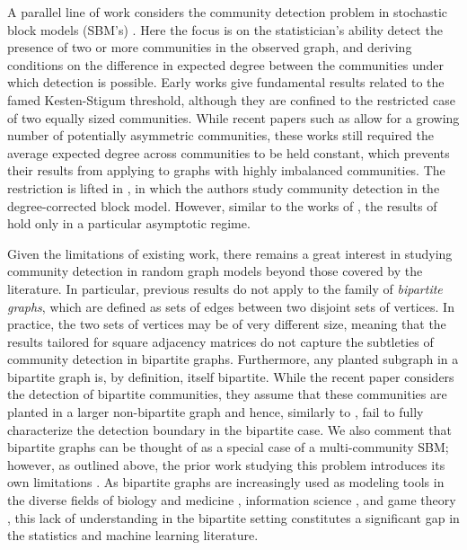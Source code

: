 \documentclass{article}
\begin{document}
A parallel line of work considers the community detection problem in stochastic block models (SBM's) \cite{janson2010asymptotic, massoulie2014community, mossel2015reconstruction, abbe2015community, banerjee2018contiguity, banerjee2017optimal, banks2016information, gao2017testing}. Here the focus is on the statistician's ability detect the presence of two or more communities in the observed graph, and deriving conditions on the difference in expected degree between the communities under which detection is possible. Early works \cite{abbe2015community, mossel2015reconstruction} give fundamental results related to the famed Kesten-Stigum threshold, although they are confined to the restricted case of two equally sized communities. While recent papers such as \cite{banks2016information, mossel2024weak} allow for a growing number of potentially asymmetric communities, these works still required the average expected degree across communities to be held constant, which prevents their results from applying to graphs with highly imbalanced communities. The restriction is lifted in \cite{gao2018community}, in which the authors study community detection in the degree-corrected block model. However, similar to the works of \cite{arias2014community, verzelen2015community, rotenberg2024planted}, the results of \cite{gao2018community} hold only in a particular asymptotic regime.

Given the limitations of existing work, there remains a great interest in studying community detection in random graph models beyond those covered by the literature. In particular, previous results do not apply to the family of \textit{bipartite graphs}, which are defined as sets of edges between two disjoint sets of vertices. In practice, the two sets of vertices may be of very different size, meaning that the results tailored for square adjacency matrices \cite{arias2014community, verzelen2015community, abbe2015community, mossel2015reconstruction} do not capture the subtleties of community detection in bipartite graphs. Furthermore, any planted subgraph in a bipartite graph is, by definition, itself bipartite. While the recent paper \cite{rotenberg2024planted} considers the detection of bipartite communities, they assume that these communities are planted in a larger non-bipartite graph and hence, similarly to \cite{arias2014community, verzelen2015community, abbe2015community, mossel2015reconstruction}, fail to fully characterize the detection boundary in the bipartite case. We also comment that bipartite graphs can be thought of as a special case of a multi-community SBM; however, as outlined above, the prior work studying this problem introduces its own limitations \cite{banks2016information, mossel2024weak, gao2018community}. As bipartite graphs are increasingly used as modeling tools in the diverse fields of biology and medicine \cite{pavlopoulos2018bipartite}, information science \cite{maier2022bipartite}, and game theory \cite{pena2012bipartite}, this lack of understanding in the bipartite setting constitutes a significant gap in the statistics and machine learning literature.
\end{document}

